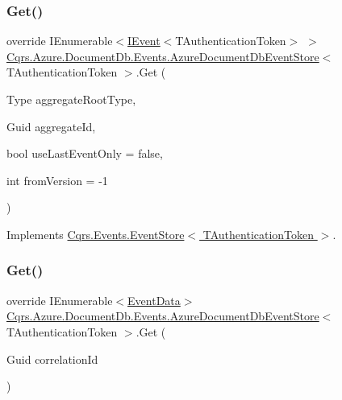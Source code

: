 \subsubsection{\texorpdfstring{Get()}{Get()}\hspace{0.1cm}{\footnotesize\ttfamily [1/2]}}
{\footnotesize\ttfamily override I\+Enumerable$<$\hyperlink{interfaceCqrs_1_1Events_1_1IEvent}{I\+Event}$<$T\+Authentication\+Token$>$ $>$ \hyperlink{classCqrs_1_1Azure_1_1DocumentDb_1_1Events_1_1AzureDocumentDbEventStore}{Cqrs.\+Azure.\+Document\+Db.\+Events.\+Azure\+Document\+Db\+Event\+Store}$<$ T\+Authentication\+Token $>$.Get (\begin{DoxyParamCaption}\item[{Type}]{aggregate\+Root\+Type,  }\item[{Guid}]{aggregate\+Id,  }\item[{bool}]{use\+Last\+Event\+Only = {\ttfamily false},  }\item[{int}]{from\+Version = {\ttfamily -\/1} }\end{DoxyParamCaption})\hspace{0.3cm}{\ttfamily [virtual]}}



Implements \hyperlink{classCqrs_1_1Events_1_1EventStore_aa1d0d399a35c1e3b0759e27202695d8b_aa1d0d399a35c1e3b0759e27202695d8b}{Cqrs.\+Events.\+Event\+Store$<$ T\+Authentication\+Token $>$}.

\mbox{\label{classCqrs_1_1Azure_1_1DocumentDb_1_1Events_1_1AzureDocumentDbEventStore_ac59ce599b768ce047869b8ac135f4e22_ac59ce599b768ce047869b8ac135f4e22}} 
\subsubsection{\texorpdfstring{Get()}{Get()}\hspace{0.1cm}{\footnotesize\ttfamily [2/2]}}
{\footnotesize\ttfamily override I\+Enumerable$<$\hyperlink{classCqrs_1_1Events_1_1EventData}{Event\+Data}$>$ \hyperlink{classCqrs_1_1Azure_1_1DocumentDb_1_1Events_1_1AzureDocumentDbEventStore}{Cqrs.\+Azure.\+Document\+Db.\+Events.\+Azure\+Document\+Db\+Event\+Store}$<$ T\+Authentication\+Token $>$.Get (\begin{DoxyParamCaption}\item[{Guid}]{correlation\+Id }\end{DoxyParamCaption})\hspace{0.3cm}{\ttfamily [virtual]}}



